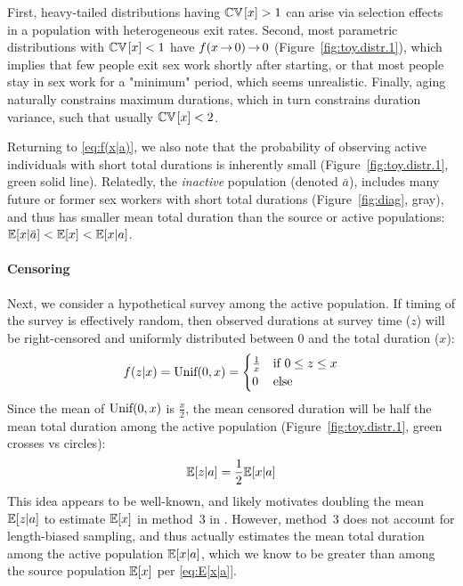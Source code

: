 First, heavy-tailed distributions having $\mathbb{CV}\hskip1pt[x] > 1$ can arise via selection effects
in a population with heterogeneous exit rates.\cite{Balan2020}
Second, most parametric distributions with $\mathbb{CV}\hskip1pt[x] < 1$
have $f(x\,{\rightarrow}\,0)\,{\rightarrow}\,0$ (Figure~\ref{fig:toy.distr.1}), which implies
that few people exit sex work shortly after starting, or
that most people stay in sex work for a "minimum" period,
which seems unrealistic.
Finally, aging naturally constrains maximum durations,
which in turn constrains duration variance,
such that usually $\mathbb{CV}\hskip1pt[x] < 2$.
\par
Returning to \eqref{eq:f(x|a)},
we also note that the probability of observing
active individuals with short total durations is inherently small
(Figure~\ref{fig:toy.distr.1}, green solid line).
Relatedly, the \emph{inactive} population (denoted $\bar{a}$),
includes many future or former sex workers with short total durations
(Figure~\ref{fig:diag}, gray),
and thus has smaller mean total duration than the source or active populations:
$\mathbb{E}[x|\bar{a}] < \mathbb{E}[x] < \mathbb{E}[x|a]$.
\paragraph{Censoring}
Next, we consider a hypothetical survey among the active population.
If timing of the survey is effectively random, then
observed durations at survey time ($z$) will be right-censored
and uniformly distributed between 0 and the total duration ($x$):
\begin{equation}
  f(z|x) = \textnormal{Unif}(0,x) =
  \begin{cases}
    \frac{1}{x} & \textnormal{if}~ 0 \le z \le x \\
    0 & \textnormal{else}
  \end{cases}
  \label{eq:f(z|x)}
\end{equation}
Since the mean of $\textnormal{Unif}(0,x)$ is $\frac{x}{2}$,
the mean censored duration will be half
the mean total duration among the active population
(Figure~\ref{fig:toy.distr.1}, green crosses vs circles):
\begin{equation}
  \mathbb{E}[z|a] = \frac{1}{2} \mathbb{E}[x|a]
  \label{eq:E[z|a]}
\end{equation}
This idea appears to be well-known, and likely motivates
doubling the mean $\mathbb{E}[z|a]$ to estimate $\mathbb{E}[x]$ in method~3 in \citep{Fazito2012}.
However, method~3 does not account for length-biased sampling,
and thus actually estimates the mean total duration among the active population $\mathbb{E}[x|a]$,
which we know to be greater than among the source population $\mathbb{E}[x]$ per \eqref{eq:E[x|a]}.
